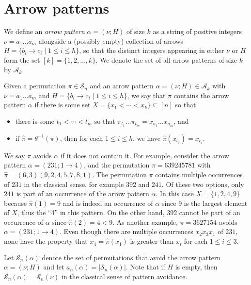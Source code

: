 \documentclass[11pt]{article}
\renewcommand\S{\mathcal S}
\newcommand\A{\mathcal A}
\theoremstyle{definition}
\begin{document}
\section{Arrow patterns}\label{sec:arrows}

We define an \emph{arrow pattern} $\alpha = (\nu; H)$ of size $k$ as a string of positive integers $\nu = a_1\ldots a_m$ alongside a (possibly empty) collection of arrows $H = \{b_i \to c_i \mid 1 \leq i \leq h\}$, so that the distinct integers appearing in either $\nu$ or $H$ form the set $[k]=\{1,2,\dots,k\}$. We denote the set of all arrow patterns of size $k$ by $\A_k$.

Given a permutation $\pi\in\S_n$ and an arrow pattern $\alpha=(\nu;H)\in\A_k$ with $\nu=a_1\ldots a_m$ and $H=\{b_i\to c_i \mid 1\leq i \leq h\}$, we say that $\pi$ contains the arrow pattern $\alpha$ if there is some set $X=\{x_1<\cdots<x_k\}\subseteq[n]$ so that
\begin{itemize}
    \item there is some $t_1<\cdots <t_m$ so that $\pi_{t_1}\ldots \pi_{t_m} = x_{a_1}\ldots x_{a_m}$, and 
    \item if $\hat\pi=\theta^{-1}(\pi)$, then for each $1\leq i \leq h$, we have $\hat\pi(x_{b_i})=x_{c_i}$.
\end{itemize}

We say $\pi$ avoids $\alpha$ if it does not contain it. For example, consider the arrow pattern $\alpha=(231;1\to4)$, and the permutation $\pi = 639245781$ with $\hat\pi = (6,3)(9,2,4,5,7,8,1)$. %
The permutation $\pi$ contains multiple occurrences of $231$ in the classical sense, for example $392$ and $241$. Of these two options, only $241$ is part of an occurrence of the arrow pattern $\alpha$. In this case $X = \{1,2,4,9\}$ because $\hat\pi(1) = 9$ and is indeed an occurrence of $\alpha$ since 9 is the largest element of $X$, thus the ``4'' in this pattern. On the other hand, 392 cannot be part of an occurrence of $\alpha$ since $\hat\pi(2) = 4 < 9$.
As another example, $\pi = 3627154$ avoids $\alpha = (231; 1 \to 4)$. Even though there are multiple occurrences $x_2x_3x_1$ of $231$, none have the property that $x_4=\hat\pi(x_1)$ is greater than $x_i$ for each $1\leq i \leq 3.$

Let $\S_n(\alpha)$ denote the set of permutations that avoid the arrow
pattern $\alpha=(\nu;H)$ and let 
$a_n(\alpha)=|\S_n(\alpha)|.$ Note that if $H$ is empty, then $\S_n(\alpha) = \S_n(\nu)$ in the classical sense of pattern avoidance. 
\end{document}
